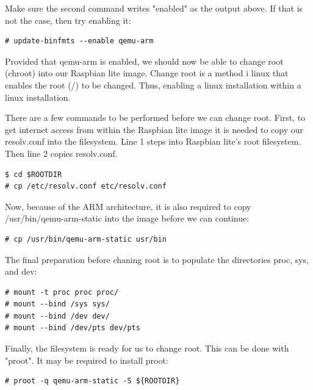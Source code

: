 Make sure the second command writes "enabled" as the output above. If that 
is not the case, then try enabling it:

\begin{lstlisting}[]
# update-binfmts --enable qemu-arm
\end{lstlisting}
\FloatBarrier
\vspace{-5mm}

Provided that qemu-arm is enabled, we should now be able to change root (chroot)
into our Raspbian lite image. Change root is a method i linux that enables
the root (/) to be changed. Thus, enabling a linux installation within a
linux installation.

There are a few commands to be performed before we can change root.
First, to get internet access from within the Raspbian lite image it is needed
to copy our resolv.conf into the filesystem. Line 1 steps into Raspbian lite's
root filesystem. Then line 2 copies resolv.conf.

\begin{lstlisting}[]
$ cd $ROOTDIR
# cp /etc/resolv.conf etc/resolv.conf
\end{lstlisting}
\FloatBarrier
\vspace{-5mm}

Now, because of the ARM architecture, it is also required to copy
/usr/bin/qemu-arm-static into the image before we can continue:

\begin{lstlisting}[]
# cp /usr/bin/qemu-arm-static usr/bin
\end{lstlisting}
\FloatBarrier
\vspace{-5mm}

The final preparation before chaning root is to populate the directories proc,
sys, and dev:

\begin{lstlisting}[]
# mount -t proc proc proc/
# mount --bind /sys sys/
# mount --bind /dev dev/
# mount --bind /dev/pts dev/pts
\end{lstlisting}
\FloatBarrier
\vspace{-5mm}

Finally, the filesystem is ready for us to change root. This can be done with
"proot". It may be required to install proot:

\begin{lstlisting}[]
# proot -q qemu-arm-static -S ${ROOTDIR}
\end{lstlisting}
\FloatBarrier
\vspace{-5mm}

